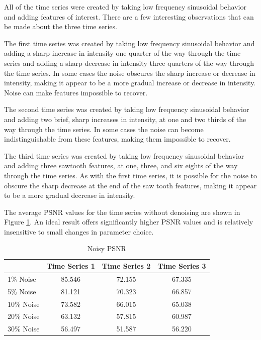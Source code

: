 \documentclass[11pt]{article}
\theoremstyle{definition}
\begin{document}
All of the time series were created by taking low frequency sinusoidal behavior and adding features of interest. There are a few interesting observations that can be made about the three time series.

The first time series was created by taking low frequency sinusoidal behavior and adding a sharp increase in intensity one quarter of the way through the time series and adding a sharp decrease in intensity three quarters of the way through the time series. In some cases the noise obscures the sharp increase or decrease in intensity, making it appear to be a more gradual increase or decrease in intensity. Noise can make features impossible to recover.

The second time series was created by taking low frequency sinusoidal behavior and adding two brief, sharp increases in intensity, at one and two thirds of the way through the time series. In some cases the noise can become indistinguishable from these features, making them impossible to recover.

The third time series was created by taking low frequency sinusoidal behavior and adding three sawtooth features, at one, three, and six eights of the way through the time series. As with the first time series, it is possible for the noise to obscure the sharp decrease at the end of the saw tooth features, making it appear to be a more gradual decrease in intensity.

The average PSNR values for the time series without denoising are shown in Figure \ref{noisypsnr}. An ideal result offers significantly higher PSNR values and is relatively insensitive to small changes in parameter choice.

\begin{table}
\small
\begin{center}
\begin{tabular}{l | c | c | c}
 & Time Series 1 & Time Series 2 & Time Series 3 \\ \hline
1\% Noise & 85.546 & 72.155 & 67.335 \\ \hline
5\% Noise & 81.121 & 70.323 & 66.857 \\ \hline
10\% Noise & 73.582 & 66.015 & 65.038 \\ \hline
20\% Noise & 63.132 & 57.815 & 60.987 \\ \hline
30\% Noise & 56.497 & 51.587 & 56.220
\end{tabular}
\caption{Noisy PSNR}
\label{noisypsnr}
\end{center}
\end{table}
\end{document}
